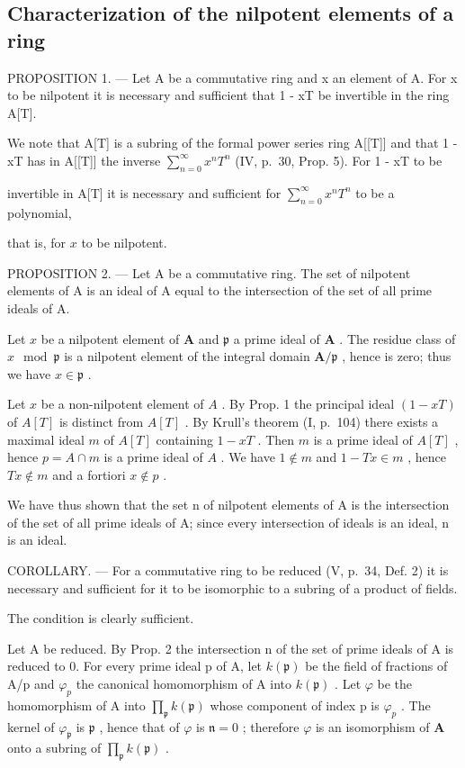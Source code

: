 \subsection{Characterization of the nilpotent elements of a ring}

PROPOSITION 1. --- Let A be a commutative ring and x an element of A. For x to be nilpotent it is necessary and sufficient that 1 - xT be invertible in the ring A{[}T{]}.

We note that A{[}T{]} is a subring of the formal power series ring A{[}{[}T{]}{]} and that 1 - xT has in A{[}{[}T{]}{]} the inverse \(\sum_{n=0}^{\infty} x^{n} T^{n}\) (IV, p.~30, Prop. 5). For 1 - xT to be

invertible in A{[}T{]} it is necessary and sufficient for \(\sum_{n=0}^{\infty} x^n T^n\) to be a polynomial,

that is, for \(x\) to be nilpotent.

PROPOSITION 2. --- Let A be a commutative ring. The set of nilpotent elements of A is an ideal of A equal to the intersection of the set of all prime ideals of A.

Let \(x\) be a nilpotent element of \(\mathbf{A}\) and \(\mathfrak{p}\) a prime ideal of \(\mathbf{A}\) . The residue class of \(x \mod \mathfrak{p}\) is a nilpotent element of the integral domain \(\mathbf{A} / \mathfrak{p}\) , hence is zero; thus we have \(x \in \mathfrak{p}\) .

Let \(x\) be a non-nilpotent element of \(A\) . By Prop. 1 the principal ideal \((1 - xT)\) of \(A[T]\) is distinct from \(A[T]\) . By Krull's theorem (I, p.~104) there exists a maximal ideal \(m\) of \(A[T]\) containing \(1 - xT\) . Then \(m\) is a prime ideal of \(A[T]\) , hence \(p = A \cap m\) is a prime ideal of \(A\) . We have \(1 \notin m\) and \(1 - Tx \in m\) , hence \(Tx \notin m\) and a fortiori \(x \notin p\) .

We have thus shown that the set n of nilpotent elements of A is the intersection of the set of all prime ideals of A; since every intersection of ideals is an ideal, n is an ideal.

COROLLARY. --- For a commutative ring to be reduced (V, p.~34, Def. 2) it is necessary and sufficient for it to be isomorphic to a subring of a product of fields.

The condition is clearly sufficient.

Let A be reduced. By Prop. 2 the intersection n of the set of prime ideals of A is reduced to 0. For every prime ideal p of A, let \(k(\mathfrak{p})\) be the field of fractions of A/p and \(\varphi_{p}\) the canonical homomorphism of A into \(k(\mathfrak{p})\) . Let \(\varphi\) be the homomorphism of A into \(\prod_{\mathfrak{p}} k(\mathfrak{p})\) whose component of index p is \(\varphi_{p}\) . The kernel of \(\varphi_{\mathfrak{p}}\) is \(\mathfrak{p}\) , hence that of \(\varphi\) is \(\mathfrak{n} = 0\) ; therefore \(\varphi\) is an isomorphism of \(\mathbf{A}\) onto a subring of \(\prod_{\mathfrak{p}} k(\mathfrak{p})\) .

